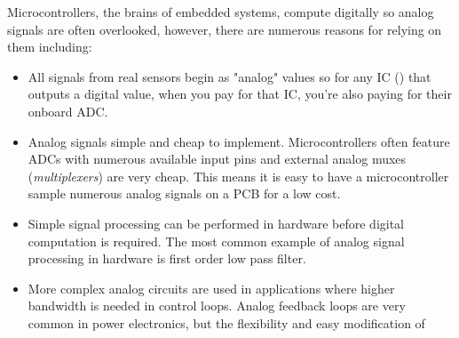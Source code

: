 \documentclass[main.tex]{subfiles}
\begin{document}
Microcontrollers, the brains of embedded systems, compute digitally so analog signals are often overlooked, however, there are numerous reasons for relying on them including: 
\begin{itemize}
    \item All signals from real sensors begin as "analog" values so for any IC () that outputs a digital value, when you pay for that IC, you're also paying for their onboard ADC.
    \item Analog signals simple and cheap to implement. Microcontrollers often feature ADCs with numerous available input pins and external analog muxes (\textit{multiplexers}) are very cheap. This means it is easy to have a microcontroller sample numerous analog signals on a PCB for a low cost.
    \item Simple signal processing can be performed in hardware before digital computation is required. The most common example of analog signal processing in hardware is first order low pass filter. 
    \item More complex analog circuits are used in applications where higher bandwidth is needed in control loops. Analog feedback loops are very common in power electronics, but the flexibility and easy modification of 
\end{itemize}


\end{document}
